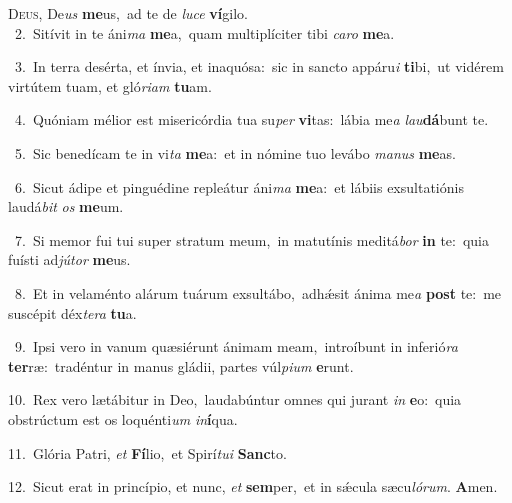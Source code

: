 \lettrine{\initial\textcolor{\initialcolor}{D}}{eus,} De\textit{us} \textbf{me}\-us,~\star ad te de \textit{lu}\-\textit{ce} \textbf{ví}\-gilo.\\
{\numbfont\textcolor{\numbcolor}{~2.}}~Sitívit in te áni\textit{ma} \textbf{me}\-a,~\star quam multiplíciter tibi \textit{ca}\-\textit{ro} \textbf{me}\-a.\par
{\numbfont\textcolor{\numbcolor}{~3.}}~In terra desérta, et ínvia, et inaquósa:~\dagger sic in sancto appáru\textit{i} \textbf{ti}\-bi,~\star ut vidérem virtútem tuam, et gló\-\textit{ri}\-\textit{am} \textbf{tu}\-am.\par
{\numbfont\textcolor{\numbcolor}{~4.}}~Quóniam mélior est misericórdia tua su\textit{per} \textbf{vi}\-tas:~\star lábia me\textit{a} \textit{lau}\-\textbf{dá}bunt te.\par
{\numbfont\textcolor{\numbcolor}{~5.}}~Sic benedícam te in vi\textit{ta} \textbf{me}\-a:~\star et in nómine tuo levábo \textit{ma}\-\textit{nus} \textbf{me}\-as.\par
{\numbfont\textcolor{\numbcolor}{~6.}}~Sicut ádipe et pinguédine repleátur áni\textit{ma} \textbf{me}\-a:~\star et lábiis exsultatiónis laudá\textit{bit} \textit{os} \textbf{me}\-um.\par
{\numbfont\textcolor{\numbcolor}{~7.}}~Si memor fui tui super stratum meum,~\dagger in matutínis meditá\textit{bor} \textbf{in} te:~\star quia fuísti ad\-\textit{jú}\-\textit{tor} \textbf{me}\-us.\par
{\numbfont\textcolor{\numbcolor}{~8.}}~Et in velaménto alárum tuárum exsultábo,~\dagger adhǽsit ánima me\textit{a} \textbf{post} te:~\star me suscépit déx\-\textit{te}\-\textit{ra} \textbf{tu}\-a.\par
{\numbfont\textcolor{\numbcolor}{~9.}}~Ipsi vero in vanum quæsiérunt ánimam meam,~\dagger introíbunt in inferió\textit{ra} \textbf{ter}\-ræ:~\star tradéntur in manus gládii, partes vúl\-\textit{pi}\-\textit{um} \textbf{e}\-runt.\par
{\numbfont\textcolor{\numbcolor}{10.}}~Rex vero lætábitur in Deo,~\dagger laudabúntur omnes qui jurant \textit{in} \textbf{e}\-o:~\star quia obstrúctum est os loquénti\textit{um} \textit{in}\-\textbf{í}qua.\par
{\numbfont\textcolor{\numbcolor}{11.}}~Glória Patri, \textit{et} \textbf{Fí}\-lio,~\star et Spirí\-\textit{tu}\-\textit{i} \textbf{Sanc}\-to.\par
{\numbfont\textcolor{\numbcolor}{12.}}~Sicut erat in princípio, et nunc, \textit{et} \textbf{sem}\-per,~\star et in sǽcula sæcu\-\textit{ló}\-\textit{rum}. \textbf{A}\-men.\par
